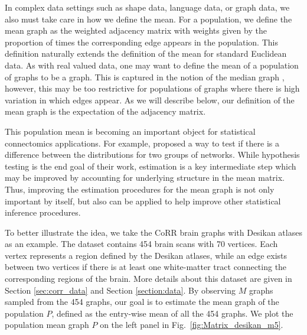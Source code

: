\documentclass[10pt,letterpaper]{article}
\begin{document}
In complex data settings such as shape data, language data, or graph data, we also must take care in how we define the mean.
For a population, we define the mean graph as the weighted adjacency matrix with weights given by the proportion of times the corresponding edge appears in the population. 
This definition naturally extends the definition of the mean for standard Euclidean data.
As with real valued data, one may want to define the mean of a population of graphs to be a graph.
This is captured in the notion of the median graph \citep{jiang2001median}, however, this may be too restrictive for populations of graphs where there is high variation in which edges appear. 
As we will describe below, our definition of the mean graph is the expectation of the adjacency matrix.

This population mean is becoming an important object for statistical connectomics applications.
For example, \citet{ginestet2014hypothesis} proposed a way to test if there is a difference between the distributions for two groups of networks.  
While hypothesis testing is the end goal of their work, estimation is a key intermediate step which may be improved by accounting for underlying structure in the mean matrix. 
Thus, improving the estimation procedures for the mean graph is not only important by itself, but also can be applied to help improve other statistical inference procedures.

To better illustrate the idea, we take the CoRR brain graphs with Desikan atlases as an example. The dataset contains 454 brain scans with 70 vertices. Each vertex represents a region defined by the Desikan atlases, while an edge exists between two vertices if there is at least one white-matter tract connecting the corresponding regions of the brain. More details about this dataset are given in Section \ref{sec:corr_data} and Section \ref{section:data}. By observing $M$ graphs sampled from the 454 graphs, our goal is to estimate the mean graph of the population $P$, defined as the entry-wise mean of all the 454 graphs. We plot the population mean graph $P$ on the left panel in Fig.~\ref{fig:Matrix_desikan_m5}.
\end{document}
